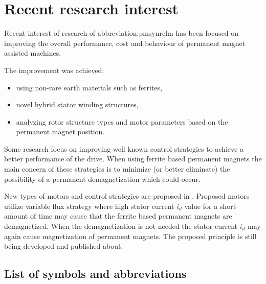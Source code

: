 \documentclass[a4paper, twoside, 11pt]{article}
\begin{document}
\section{Recent research interest}
    Recent interest of research of \gls{abbreviation:pmsynrelm} has been focused on improving the overall performance, cost and behaviour of permanent magnet assisted machines.\par
    The improvement was achieved:
        \begin{itemize}
        \item using non-rare earth materials such as ferrites,
        \item novel hybrid stator winding structures,
        \item analyzing rotor structure types and motor parameters based on the permanent magnet position.
        \end{itemize}

    Some research focus on improving well known control strategies to achieve a better performance of the drive. When using ferrite based permanent magnets the main concern of these strategies is to minimize (or better eliminate) the possibility of a permanent demagnetization which could occur.\par
    New types of motors and control strategies are proposed in \cite{ostovic-Memory-motors-a-new-class-of-controllable-flux-PM-machines-for-a-true-wide-speed-operation}. Proposed motors utilize variable flux strategy where high stator current $i_d$ value for a short amount of time may cause that the ferrite based permanent magnets are demagnetized. When the demagnetization is not needed the stator current $i_d$ may again cause magnetization of permanent magnets. The proposed principle is still being developed and published about.


\flushbottom %


\newpage
\setmonofont{Times New Roman}

\printbibliography[title={{References}}]	
\nocite{*}
\setmonofont{CourierPrime-Regular}

\appendix
{}

\begin{appendices}
	\section{List of symbols and abbreviations}

		\printglossary[type=abbreviationslist, style = myStyleAbbreviations]

		\FloatBarrier
		\printglossary[type=symbolslist, style =  myStyleSymbols]

	\end{appendices}
\end{document}
